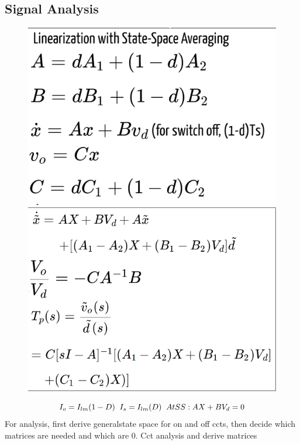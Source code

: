\documentclass[twocolumn]{article}
\begin{document}
\subsection*{\small Signal Analysis}
 \begin{figure}[!ht]
	\includegraphics[scale=0.36]{ss1}
\hspace{0.05 cm}
	\includegraphics[scale=0.34]{ss2}
\end{figure}
\begin{equation*}
I_{o}=I_{lm}(1-D) 
\hspace{0.2cm}
I_{s}=I_{lm}(D)
\hspace{0.2cm}
At SS: AX+BV_{d}=0
\end{equation*}
For analysis, first derive generalstate space for on and off ccts, then decide which matrices are needed and which are 0. Cct analysis and derive matrices
\end{document}
